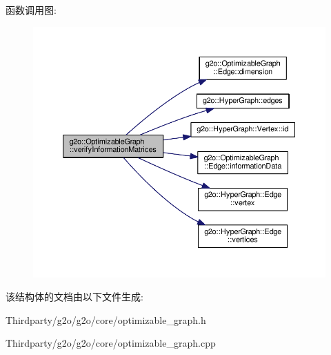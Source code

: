 函数调用图\-:
\nopagebreak
\begin{figure}[H]
\begin{center}
\leavevmode
\includegraphics[width=350pt]{structg2o_1_1OptimizableGraph_aae5f20da3c13042a9bc1f491f2150d59_cgraph}
\end{center}
\end{figure}




该结构体的文档由以下文件生成\-:\begin{DoxyCompactItemize}
\item 
Thirdparty/g2o/g2o/core/optimizable\-\_\-graph.\-h\item 
Thirdparty/g2o/g2o/core/optimizable\-\_\-graph.\-cpp\end{DoxyCompactItemize}
